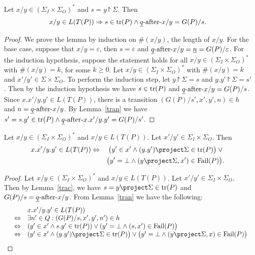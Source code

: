\begin{lemma}\label{trac}

Let $x/y\in (\Sigma_I\times\Sigma_O)^*$ and $s=y\project \Sigma$. Then $$x/y\in L(T(P))\Rightarrow s\in\text{tr}(P) \wedge \underline q\text{-after-} x/y=G(P)/s.$$    
\end{lemma}
\begin{proof}
We prove the lemma by induction on $\#(x/y)$,  the length of $x/y$. For the base case, suppose that $x/y=\varepsilon $, then $s=\varepsilon $ and $\underline q\text{-after-} x/y=\underline n=G(P)/{\varepsilon }$. For the induction hypothesis, suppose the statement holds for all $x/y\in (\Sigma_I\times\Sigma_O)^*$ with $\#(x/y)=k$, for some $k\ge 0$. Let $x/y\in (\Sigma_I\times\Sigma_O)^*$ with $\#(x/y)=k$ and $x'/y'\in \Sigma\times \Sigma_O$. To perform the induction step, let $y\project \Sigma=s$ and $y.y'\project \Sigma=s'$. Then by the induction hypothesis we have $s\in\text{tr}(P)$ and $\underline q\text{-after-} x/y=G(P)/s$. 
Since $x.x'/y.y'\in L(T(P))$, there is a transition $(G(P)/s',x',y',n)\in h$ and $n=\underline q\text{-after-} x/y$. By Lemma~\ref{tran} we have $s'=s.y'\in \text{tr}(P)\wedge \underline q\text{-after-} x.x'/y.y'=G(P)/s'$.
\xbox
\end{proof}%


\begin{lemma}\label{exte}
Let $x/y\in (\Sigma_I\times \Sigma_O)^*$ and $x/y\in L(T(P))$. Let $x'/y'\in \Sigma_I\times \Sigma_O$. Then 
\begin{eqnarray*}
x.x'/y.y'\in L(T(P)) & \Leftrightarrow  &
\big(y'\in x'\wedge (y.y')\project \Sigma\in \trc(P)\big)\vee {}
\\ & & \big(y'=\bot\wedge (y\project \Sigma, x')\in {\text {\rm Fail}}(P)\big).
\end{eqnarray*}
\end{lemma}

\begin{proof}
Let $x/y\in (\Sigma_I\times \Sigma_O)^*$ and $x/y\in L(T(P))$. Let $x'/y'\in \Sigma_I\times \Sigma_O$. Then by Lemma~\ref{trac}, we have $s=y\project \Sigma\in \trc(P)$ and $G(P)/s=\underline q\text{-after-} x/y$. From Lemma~\ref{tran} we have the following:
\[\begin{array}{lll}
&&x.x'/y.y'\in L(T(P)) \\&\Leftrightarrow & \exists n'\in Q: (G(P)/s,x',y',n')\in h\\
&\Leftrightarrow & (y'\in x'\wedge s.y'\in \trc(P))\vee (y'=\bot\wedge (s, x')\in {\text {\rm Fail}}(P)\big)\\
&\Leftrightarrow & (y'\in x'\wedge (y.y')\project \Sigma\in \trc(P)\big)\vee \big(y'=\bot\wedge (y\project \Sigma, x)\in {\text {\rm Fail}}(P)\big)\end{array}
\]
\end{proof}


